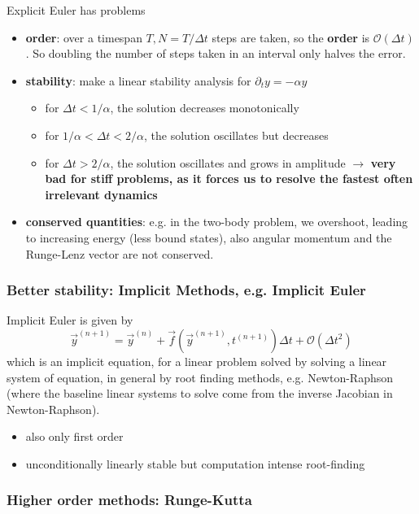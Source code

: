 \textcolor{red1}{Explicit Euler has problems}
\begin{itemize}
    \item \textbf{order}: over a timespan $T, N = T \slash \Delta t$ steps are taken, so the \textbf{order} is $\mathcal{O}(\Delta t)$.
    So doubling the number of steps taken in an interval only halves the error.
    \item \textbf{stability}: make a linear stability analysis for $\partial_t y = -\alpha y$
    \begin{itemize}
        \item for $\Delta t < 1 \slash \alpha$, the solution decreases monotonically
        \item for $1 \slash \alpha < \Delta t < 2 \slash \alpha$, the solution oscillates but decreases
        \item for $\Delta t > 2 \slash \alpha$, the solution oscillates and grows in amplitude $\rightarrow$ \textbf{very bad for stiff problems, as it forces us to resolve the fastest often irrelevant dynamics}
    \end{itemize}
    \item \textbf{conserved quantities}: e.g. in the two-body problem, we overshoot, leading to increasing energy (less bound states),
    also angular momentum and the Runge-Lenz vector are not conserved.
\end{itemize}

\subsubsection*{Better stability: Implicit Methods, e.g. Implicit Euler}
Implicit Euler is given by
\begin{equation}
    \vec{y}^{(n+1)} = \vec{y}^{(n)} + \vec{f} \left( \vec{y}^{(n+1)}, t^{(n + 1)} \right) \Delta t + \mathcal{O}(\Delta t^2)
\end{equation}
which is an implicit equation, for a linear problem solved by solving
a linear system of equation, in general by root finding methods, e.g. Newton-Raphson
(where the baseline linear systems to solve come from the inverse Jacobian in Newton-Raphson).
\begin{itemize}
    \item \textcolor{red1}{also only first order}
    \item \textcolor{green1}{unconditionally linearly stable} but \textcolor{red1}{computation intense root-finding}
\end{itemize}

\subsubsection*{Higher order methods: Runge-Kutta}


\pagebreak